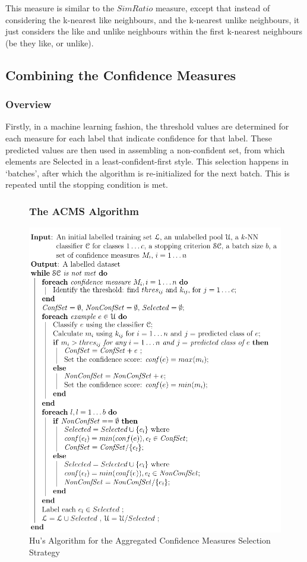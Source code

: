 \documentclass[a4paper,11pt]{report}
\begin{document}
This measure is similar to the $SimRatio$ measure, except that instead of considering the k-nearest like neighbours, and the k-nearest unlike neighbours, it just considers the like and unlike neighbours within the first k-nearest neighbours (be they like, or unlike).

\subsection{Combining the Confidence Measures}

\subsubsection{Overview}
Firstly, in a machine learning fashion, the threshold values are determined for each measure for each label that indicate confidence for that label. These predicted values are then used in assembling a non-confident set, from which elements are Selected in a least-confident-first style. This selection happens in `batches', after which the algorithm is re-initialized for the next batch. This is repeated until the stopping condition is met.

\begin{figure}[h!] 
\subsubsection{The ACMS Algorithm}
\centering
\includegraphics[scale=0.7]{./Others/Hu2011AggregrateAlgorithm}
\caption*{Hu's Algorithm for the Aggregated Confidence Measures Selection Strategy}
\end{figure}
\end{document}
